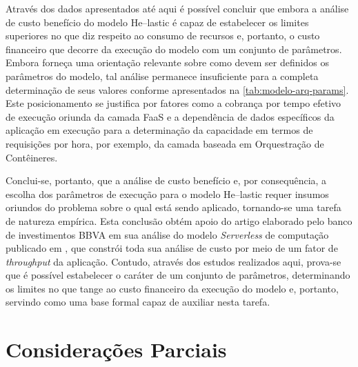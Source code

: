 \documentclass[english,brazilian]{UNISINOSmonografia} %
\begin{document}
Através dos dados apresentados até aqui é possível concluir que embora a análise de custo benefício do modelo \textsf{He}--lastic é capaz de estabelecer os limites superiores no que diz respeito ao consumo de recursos e, portanto, o custo financeiro que decorre da execução do modelo com um conjunto de parâmetros.
Embora forneça uma orientação relevante sobre como devem ser definidos os parâmetros do modelo, tal análise permanece insuficiente para a completa determinação de seus valores conforme apresentados na \autoref{tab:modelo-arq-params}.
Este posicionamento se justifica por fatores como a cobrança por tempo efetivo de execução oriunda da camada FaaS e a dependência de dados específicos da aplicação em execução para a determinação da capacidade em termos de requisições por hora, por exemplo, da camada baseada em Orquestração de Contêineres.


Conclui-se, portanto, que a análise de custo benefício e, por consequência, a escolha dos parâmetros de execução para o modelo \textsf{He}--lastic requer insumos oriundos do problema sobre o qual está sendo aplicado, tornando-se uma tarefa de natureza empírica.
Esta conclusão obtém apoio do artigo elaborado pelo banco de investimentos BBVA em sua análise do modelo \textit{Serverless} de computação publicado em , que constrói toda sua análise de custo por meio de um fator de \textit{throughput} da aplicação. 
Contudo, através dos estudos realizados aqui, prova-se que é possível estabelecer o caráter de um conjunto de parâmetros, determinando os limites no que tange ao custo financeiro da execução do modelo e, portanto, servindo como uma base formal capaz de auxiliar nesta tarefa.

%




\section{Considerações Parciais}

\end{document}
